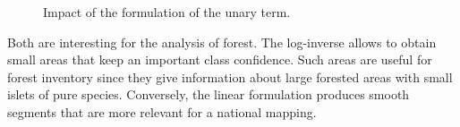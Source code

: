 \begin{figure}[htbp]
\begin{center}
\begingroup
\captionsetup[subfigure]{width=0.3\textwidth}
\hspace*{0.025\textwidth}
\hspace*{0.025\textwidth}
\endgroup
\caption{Impact of the formulation of the unary term.}
\label{fig:C3_S3_ss4_unary}
\end{center}
\end{figure}

Both are interesting for the analysis of forest. The log-inverse allows to obtain small areas that keep an important class confidence. Such areas are useful for forest inventory since they give information about large forested areas with small islets of pure species. Conversely, the linear formulation produces smooth segments that are more relevant for a national mapping.

